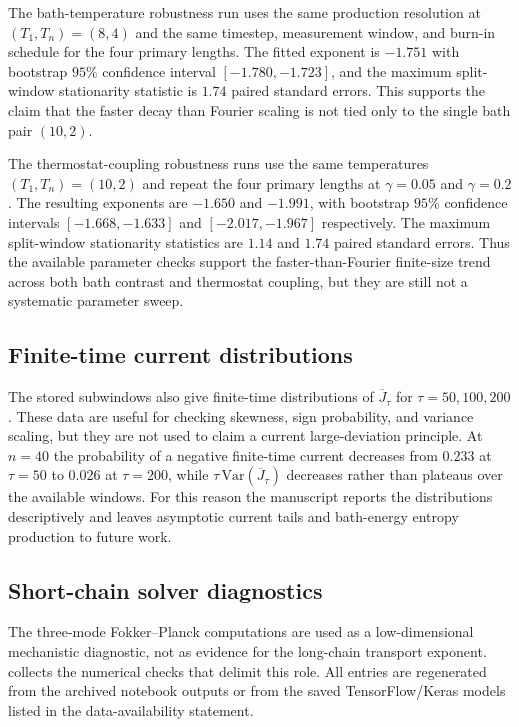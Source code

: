 \documentclass[11pt,a4paper]{article}
\theoremstyle{definition}
\numberwithin{equation}{section}   %
\begin{document}
The bath-temperature robustness run uses the same production resolution at
$(T_1,T_n)=(8,4)$ and the same timestep, measurement window, and burn-in
schedule for the four primary lengths. The fitted exponent is $-1.751$ with bootstrap
$95\%$ confidence interval $[-1.780,-1.723]$, and the maximum split-window
stationarity statistic is $1.74$ paired standard errors. This supports the
claim that the faster decay than Fourier scaling is not tied only to the
single bath pair $(10,2)$.

The thermostat-coupling robustness runs use the same temperatures
$(T_1,T_n)=(10,2)$ and repeat the four primary lengths at $\gamma=0.05$ and
$\gamma=0.2$. The resulting exponents are $-1.650$ and $-1.991$, with
bootstrap $95\%$ confidence intervals $[-1.668,-1.633]$ and
$[-2.017,-1.967]$ respectively. The maximum split-window stationarity
statistics are $1.14$ and $1.74$ paired standard errors. Thus the available
parameter checks support the faster-than-Fourier finite-size trend across
both bath contrast and thermostat coupling, but they are still not a
systematic parameter sweep.

\subsection{Finite-time current distributions}
\label{app:current-distributions}

The stored subwindows also give finite-time distributions of
$\overline J_\tau$ for $\tau=50,100,200$. These data are useful for checking
skewness, sign probability, and variance scaling, but they are not used to
claim a current large-deviation principle. At $n=40$ the probability of a
negative finite-time current decreases from $0.233$ at $\tau=50$ to $0.026$ at
$\tau=200$, while $\tau\,\mathrm{Var}(\overline J_\tau)$ decreases rather than
plateaus over the available windows. For this reason the manuscript reports
the distributions descriptively and leaves asymptotic current tails and
bath-energy entropy production to future work.

\subsection{Short-chain solver diagnostics}
\label{app:short-chain-diagnostics}

The three-mode Fokker--Planck computations are used as a low-dimensional
mechanistic diagnostic, not as evidence for the long-chain transport exponent.
 collects the numerical checks that delimit
this role. All entries are regenerated from the archived notebook outputs or
from the saved TensorFlow/Keras models listed in the data-availability
statement.
\end{document}
